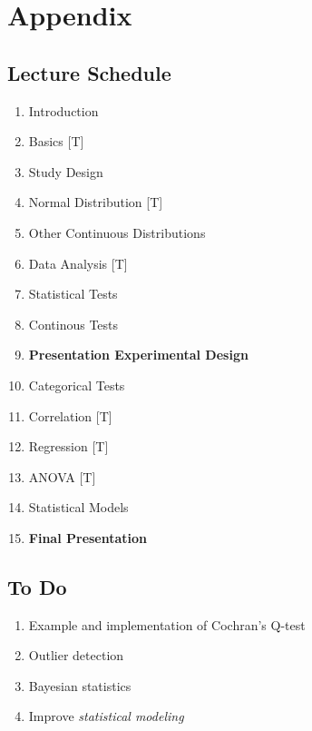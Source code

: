 \appendix
\chapter{Appendix}

\section{Lecture Schedule}

\begin{enumerate}
  \item Introduction
  \item Basics [T]
  \item Study Design
  \item Normal Distribution [T]
  \item Other Continuous Distributions
  \item Data Analysis [T]
  \item Statistical Tests
  \item Continous Tests
  \item \textbf{Presentation Experimental Design}
  \item Categorical Tests
  \item Correlation [T]
  \item Regression [T]
  \item ANOVA [T]
  \item Statistical Models
  \item \textbf{Final Presentation}
\end{enumerate}

\section{To Do}

\begin{enumerate}
  \item Example and implementation of Cochran's Q-test
  \item Outlier detection
  \item Bayesian statistics
  \item Improve \emph{statistical modeling}
\end{enumerate}
